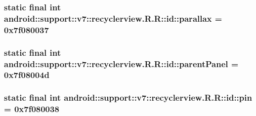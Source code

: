 \hypertarget{classandroid_1_1support_1_1v7_1_1recyclerview_1_1_r_1_1id_8aff2a7e9781e0da75c4748c258cb9b3}{
\subsubsection[{parallax}]{\setlength{\rightskip}{0pt plus 5cm}static final int android::support::v7::recyclerview.R.R::id::parallax = 0x7f080037}}
\label{classandroid_1_1support_1_1v7_1_1recyclerview_1_1_r_1_1id_8aff2a7e9781e0da75c4748c258cb9b3}


\hypertarget{classandroid_1_1support_1_1v7_1_1recyclerview_1_1_r_1_1id_ab61a9b313fe9fce0408f85f691b16a8}{
\subsubsection[{parentPanel}]{\setlength{\rightskip}{0pt plus 5cm}static final int android::support::v7::recyclerview.R.R::id::parentPanel = 0x7f08004d}}
\label{classandroid_1_1support_1_1v7_1_1recyclerview_1_1_r_1_1id_ab61a9b313fe9fce0408f85f691b16a8}


\hypertarget{classandroid_1_1support_1_1v7_1_1recyclerview_1_1_r_1_1id_b3ce5fcfeabe0fcdb02a155449483857}{
\subsubsection[{pin}]{\setlength{\rightskip}{0pt plus 5cm}static final int android::support::v7::recyclerview.R.R::id::pin = 0x7f080038}}
\label{classandroid_1_1support_1_1v7_1_1recyclerview_1_1_r_1_1id_b3ce5fcfeabe0fcdb02a155449483857}


